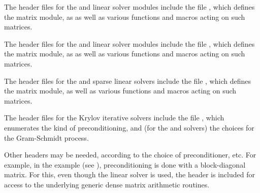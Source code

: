 The header files for the {\sunlinsoldense} and {\sunlinsollapdense}
linear solver modules include the file
, which defines the {\sunmatdense}
matrix module, as as well as various functions and macros acting on
such matrices.

The header files for the {\sunlinsolband} and {\sunlinsollapband}
linear solver modules include the file
, which defines the {\sunmatband}
matrix module, as as well as various functions and macros acting on
such matrices.

The header files for the {\sunlinsolklu} and {\sunlinsolslumt}
sparse linear solvers include the file
, which defines the {\sunmatsparse}
matrix module, as well as various functions and macros acting on such
matrices.

The header files for the Krylov iterative solvers include the file
, which enumerates the kind of
preconditioning, and (for the {\spgmr} and {\spfgmr} solvers) the
choices for the Gram-Schmidt process.

Other headers may be needed, according to the choice of
preconditioner, etc.  For example, in the 
example (see \cite{idas_ex}), preconditioning is done with a
block-diagonal matrix. For this, even though the {\sunlinsolspgmr}
linear solver is used, the header  is
included for access to the underlying generic dense matrix arithmetic
routines.

